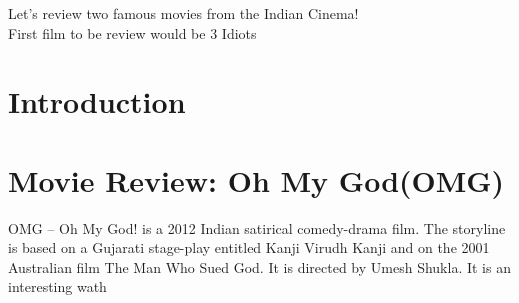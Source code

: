 \documentclass{article}
\begin{document}
Let's review two famous movies from the Indian Cinema!\\
First film to be  review would be 3 Idiots


\section{Introduction}
\section{Movie Review: Oh My God(OMG)}
OMG – Oh My God! is a 2012 Indian satirical comedy-drama film. The storyline is based on a Gujarati stage-play entitled Kanji Virudh Kanji and on the 2001 Australian film The Man Who Sued God. It is directed by Umesh Shukla. It is an interesting wath
\end{document}
